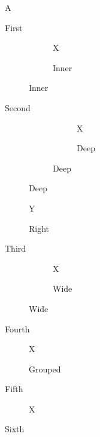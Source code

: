 \documentclass{article}
\begin{document}
\begin{figure}A\caption{First}\end{figure}
\begin{figure}
  \begin{subfigure}{0.45\textwidth}
    \begin{subfigure}{0.5\textwidth}X\caption{Inner}\label{sub:in}\end{subfigure}
  \end{subfigure}
  \caption{Second}\label{fig:two}
\end{figure}
\begin{figure}
  \begin{subfigure}{0.45\textwidth}
    \begin{subfigure}{0.5\textwidth}
      \begin{subfigure}{0.5\textwidth}X\caption{Deep}\label{sub:deep}\end{subfigure}
    \end{subfigure}
  \end{subfigure}
  \begin{subfigure}{0.45\textwidth}Y\caption{Right}\label{sub:right}\end{subfigure}
  \caption{Third}\label{fig:three}
\end{figure}
\begin{figure}
  \begin{subfigure}{0.45\textwidth}
    \begin{subfigure}{0.5\textwidth}X\caption{Wide}\label{sub:wide}\end{subfigure}
  \end{subfigure}
  \caption{Fourth}\label{fig:four}
\end{figure}
\begin{figure}
  \begin{subcaptiongroup}
    \begin{subfigure}{0.5\textwidth}X\caption{Grouped}\label{sub:grp}\end{subfigure}
  \end{subcaptiongroup}
  \caption{Fifth}\label{fig:five}
\end{figure}
\begin{figure}
  \begin{subfigure}{0.45\textwidth}
    \begin{minipage}{0.5\textwidth}X\label{sub:sc}\end{minipage}
  \end{subfigure}
  \caption{Sixth}\label{fig:six}
\end{figure}
\end{document}
